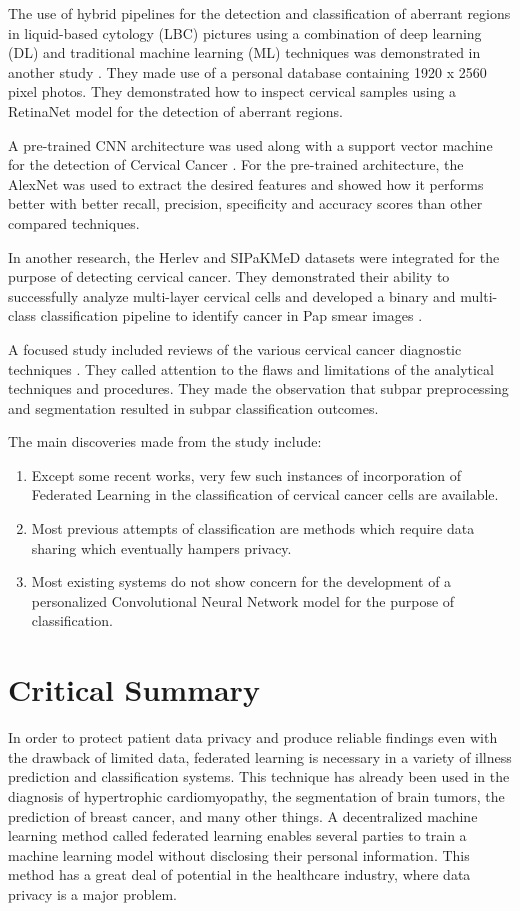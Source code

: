 The use of hybrid pipelines for the detection and classification of aberrant regions in liquid-based cytology (LBC) pictures using a combination of deep learning (DL) and traditional machine learning (ML) techniques was demonstrated in another study \cite{ar13}. They made use of a personal database containing 1920 x 2560 pixel photos. They demonstrated how to inspect cervical samples using a RetinaNet model for the detection of aberrant regions. 

A pre-trained CNN architecture was used along with a support vector machine for the detection of Cervical Cancer \cite{ar14}. For the pre-trained architecture, the AlexNet was used to extract the desired features and showed how it performs better with better recall, precision, specificity and accuracy scores than other compared techniques. 

In another research, the Herlev and SIPaKMeD datasets were integrated for the purpose of detecting cervical cancer. They demonstrated their ability to successfully analyze multi-layer cervical cells and developed a binary and multi-class classification pipeline to identify cancer in Pap smear images  \cite{ar15}. 

 A focused study included reviews of the various cervical cancer diagnostic techniques \cite{ar16}. They called attention to the flaws and limitations of the analytical techniques and procedures. They made the observation that subpar preprocessing and segmentation resulted in subpar classification outcomes.

The main discoveries made from the study include:
\begin{enumerate}
    \item
    Except some recent works, very few such instances of incorporation of Federated Learning in the classification of cervical cancer cells are available.
    \item
    Most previous attempts of classification are methods which require data sharing which eventually hampers privacy.
    \item
    Most existing systems do not show concern for the development of a personalized Convolutional Neural Network model for the purpose of classification.
\end{enumerate}


\section{Critical Summary}

In order to protect patient data privacy and produce reliable findings even with the drawback of limited data, federated learning is necessary in a variety of illness prediction and classification systems. This technique has already been used in the diagnosis of hypertrophic cardiomyopathy, the segmentation of brain tumors, the prediction of breast cancer, and many other things. A decentralized machine learning method called federated learning enables several parties to train a machine learning model without disclosing their personal information. This method has a great deal of potential in the healthcare industry, where data privacy is a major problem.

